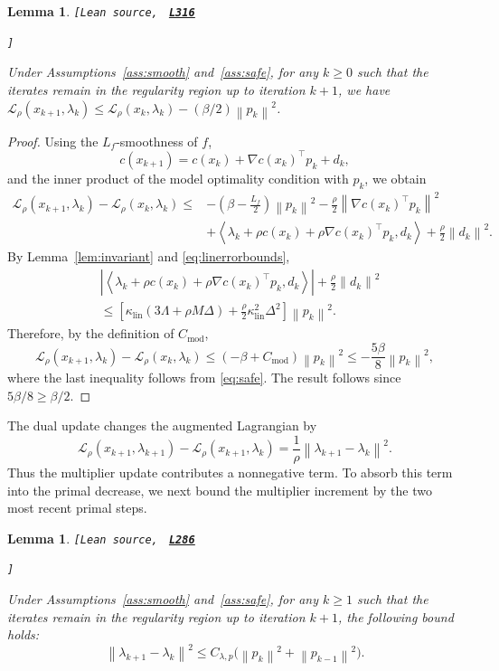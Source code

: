 \documentclass[11pt]{article}
\newtheorem{lemma}[theorem]{Lemma}
\theoremstyle{definition}
\theoremstyle{remark}
\numberwithin{equation}{section}
\numberwithin{figure}{section}
\numberwithin{table}{section}
\numberwithin{algorithm}{section}
\newcommand{\cL}{\mathcal{L}}
\newcommand{\norm}[1]{\left\lVert #1\right\rVert}
\newcommand{\ip}[2]{\left\langle #1,#2\right\rangle}
\newcommand{\grad}{\nabla}
\newcommand{\leanLinkText}[1]{%
  \underline{\textbf{#1}}%
}
\newcommand{\leanDeclTag}[2]{%
  {\footnotesize\texttt{[Lean source, }}%
  \href{https://github.com/optpku/ReasBook/blob/v4.32.2/ReasBook/Papers/TR_LALM_theory/#1?plain=1\#L#2}%
    {\leanLinkText{\footnotesize\texttt{L#2}}}%
}
\newcommand{\leanDeclTagEnd}{%
  \unskip
  {\footnotesize\texttt{]}}\enspace
}
\begin{document}
\begin{lemma}
\label{lem:primaldescent}
\leanDeclTag{Lemma_2_7.lean}{316}
\leanDeclTagEnd
Under Assumptions~\ref{ass:smooth} and~\ref{ass:safe}, for any $k\ge0$ such that the iterates remain in the regularity region up to iteration $k+1$, we have
\(\cL_\rho(x_{k+1},\lambda_k)
\le\cL_\rho(x_k,\lambda_k)-(\beta/2)\norm{p_k}^2\).
\end{lemma}

\begin{proof}
Using the $L_f$-smoothness of $f$,
$$
    c(x_{k+1})
    =
    c(x_k)+\grad c(x_k)^\top p_k+d_k,
$$
and the inner product of the model optimality condition with $p_k$,
we obtain
\begin{align*}
\cL_\rho(x_{k+1},\lambda_k)
-\cL_\rho(x_k,\lambda_k)
\leq
&-\left(\beta-\frac{L_f}{2}\right)\norm{p_k}^2
-\frac{\rho}{2}\norm{\grad c(x_k)^\top p_k}^2                 \\
&+\ip{\lambda_k+\rho c(x_k)
+\rho\grad c(x_k)^\top p_k}{d_k}
+\frac{\rho}{2}\norm{d_k}^2.
\end{align*}
By Lemma~\ref{lem:invariant} and \eqref{eq:linerrorbounds},
\begin{align*}
&\left|
\ip{\lambda_k+\rho c(x_k)
+\rho\grad c(x_k)^\top p_k}{d_k}
\right|
+\frac{\rho}{2}\norm{d_k}^2                                  \\
&\leq
\left[
\kappa_{\mathrm{lin}}(3\Lambda+\rho M\Delta)
+\frac{\rho}{2}\kappa_{\mathrm{lin}}^2\Delta^2
\right]\norm{p_k}^2.
\end{align*}
Therefore, by the definition of $C_{\mathrm{mod}}$,
$$
    \cL_\rho(x_{k+1},\lambda_k)
    -\cL_\rho(x_k,\lambda_k)
    \leq
    (-\beta+C_{\mathrm{mod}})\norm{p_k}^2
    \leq
    -\frac{5\beta}{8}\norm{p_k}^2,
$$
where the last inequality follows from \eqref{eq:safe}.  The result
follows since $5\beta/8\geq\beta/2$.
\end{proof}

The dual update changes the augmented Lagrangian by
\begin{equation}
    \cL_\rho(x_{k+1},\lambda_{k+1})
    -\cL_\rho(x_{k+1},\lambda_k)
    =\frac1\rho\norm{\lambda_{k+1}-\lambda_k}^2.
    \label{eq:dualincrease}
\end{equation}
Thus the multiplier update contributes a nonnegative term.  To absorb this term into the primal decrease, we next bound the multiplier increment by the two most recent primal steps.
\begin{lemma}
\label{lem:dualinc}
\leanDeclTag{Lemma_2_8.lean}{286}
\leanDeclTagEnd
Under Assumptions~\ref{ass:smooth} and~\ref{ass:safe}, for any $k\ge1$ such that the iterates remain in the regularity region up to iteration $k+1$, the following bound holds:
\begin{equation}
    \norm{\lambda_{k+1}-\lambda_k}^2
    \le C_{\lambda,p}
       \big(\norm{p_k}^2+\norm{p_{k-1}}^2\big).
    \label{eq:dualinc}
\end{equation}
\end{lemma}
\end{document}
